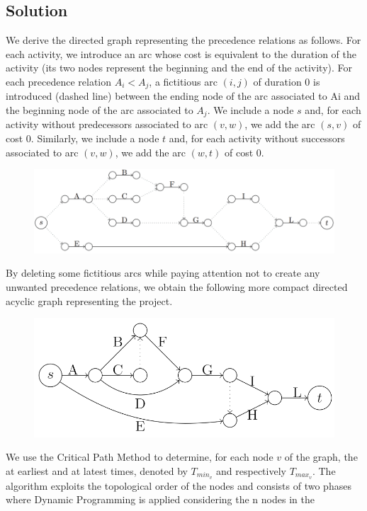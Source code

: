 \documentclass[12pt, a4paper]{report}
\begin{document}
    \subsection*{Solution}
        We derive the directed graph representing the precedence relations as follows. For each activity, we introduce an arc whose cost is equivalent to the duration of the 
        activity (its two nodes represent the beginning and the end of the activity). For each precedence relation $A_i < A_j$, a fictitious arc $(i, j)$ of duration 0 is 
        introduced (dashed line) between the ending node of the arc associated to Ai and the beginning node of the arc associated to $A_j$. We include a node $s$ and, 
        for each activity without predecessors associated to arc $(v, w)$, we add the arc $(s, v)$ of cost 0. Similarly, we include a node $t$ and, for each activity 
        without successors associated to arc $(v, w)$, we add the arc $(w, t)$ of cost 0.
        \begin{figure}[H]
            \centering
            \includegraphics[width=0.9\linewidth]{images/prog.png}
        \end{figure}
        By deleting some fictitious arcs while paying attention not to create any unwanted precedence relations, we obtain the following more compact directed 
        acyclic graph representing the project. 
        \begin{figure}[H]
            \centering
            \includegraphics[width=0.75\linewidth]{images/prog1.png}
        \end{figure}
        We use the Critical Path Method to determine, for each node $v$ of the graph, the at earliest and at latest times, denoted by $T_{min_v}$ and respectively $T_{max_v}$.
        The algorithm exploits the topological order of the nodes and consists of two phases where Dynamic Programming is applied considering the n nodes in the 
\end{document}
